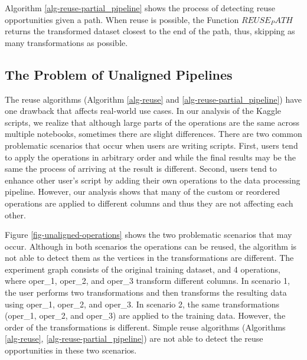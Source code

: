 Algorithm \ref{alg-reuse-partial_pipeline} shows the process of detecting reuse opportunities given a path.
When reuse is possible, the Function $REUSE_PATH$ returns the transformed dataset closest to the end of the path, thus, skipping as many transformations as possible.

\subsection{The Problem of Unaligned Pipelines}
The reuse algorithms (Algorithm \ref{alg-reuse} and \ref{alg-reuse-partial_pipeline}) have one drawback that affects real-world use cases.
In our analysis of the Kaggle scripts, we realize that although large parts of the operations are the same across multiple notebooks, sometimes there are slight differences.
There are two common problematic scenarios that occur when users are writing scripts.
First, users tend to apply the operations in arbitrary order and while the final results may be the same the process of arriving at the result is different.
Second, users tend to enhance other user's script by adding their own operations to the data processing pipeline.
However, our analysis shows that many of the custom or reordered operations are applied to different columns and thus they are not affecting each other.

Figure \ref{fig-unaligned-operations} shows the two problematic scenarios that may occur.
Although in both scenarios the operations can be reused, the algorithm is not able to detect them as the vertices in the transformations are different. 
The experiment graph consists of the original training dataset, and 4 operations, where oper\_1, oper\_2, and oper\_3 transform different columns.
In scenario 1, the user performs two transformations and then transforms the resulting data using oper\_1, oper\_2, and oper\_3.
In scenario 2, the same transformations (oper\_1, oper\_2, and oper\_3) are applied to the training data.
However, the order of the transformations is different.
Simple reuse algorithms (Algorithms \ref{alg-reuse}, \ref{alg-reuse-partial_pipeline}) are not able to detect the reuse opportunities in these two scenarios.

